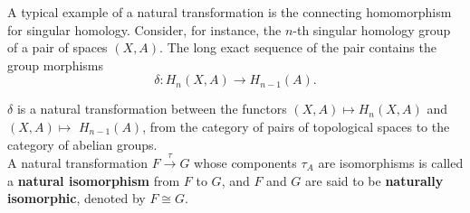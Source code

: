 \begin{example}
    A typical example of a natural transformation is the connecting homomorphism for singular homology. Consider, for instance, the $n$-th singular homology group of a pair of spaces $(X, A)$. The long exact sequence of the pair contains the group morphisms
$$
\delta: H_n(X, A) \rightarrow H_{n-1}(A) .
$$

$\delta$ is a natural transformation between the functors  $(X, A) \mapsto H_n(X, A)$ and $(X, A) \mapsto$ $H_{n-1}(A)$, from the category of pairs of topological spaces to the category of abelian groups. \\



A natural transformation $F \xrightarrow{\tau} G$ whose components $\tau_A$ are isomorphisms is called a \textbf{natural isomorphism} from $F$ to $G$, and $F$ and $G$ are said to be \textbf{naturally isomorphic}, denoted by $F \cong G$.\\




\end{example}
